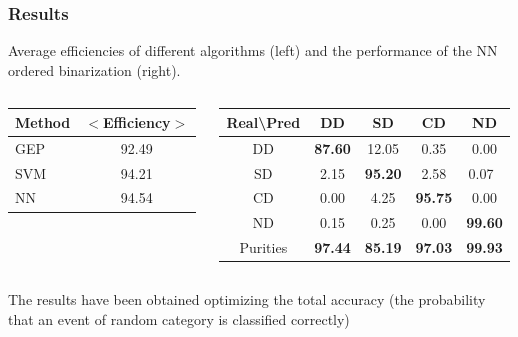 \documentclass[hyperref={pdfpagelabels=false}]{beamer}
\begin{document}
{
  \frametitle{Results}

Average efficiencies of different algorithms (left) and the performance of the NN ordered binarization (right). 

\begin{columns}
\begin{column}{4cm}

{\scriptsize
\begin{table}
\hspace{1.0cm}
\begin{tabular}{l|c}
Method & $<$Efficiency$>$ \\ \hline
GEP & 92.49 \\
SVM & 94.21 \\
NN & 94.54 \\
\end{tabular}
\end{table}
}
\end{column}
\begin{column}{7cm}

\hspace{2.2cm}
{\scriptsize
\begin{table}
\begin{tabular}{c|cccc}
  Real\textbackslash Pred & DD & SD & CD & ND \\ \hline
  DD & {\bf 87.60} & 12.05 & 0.35 & 0.00 \\
  SD & 2.15 & {\bf 95.20} & 2.58 & 0.07 \\
  CD & 0.00 & 4.25 & {\bf 95.75} & 0.00 \\
  ND & 0.15 & 0.25 & 0.00 & {\bf 99.60} \\ \hline
  Purities &  {\bf 97.44} & {\bf 85.19} & {\bf 97.03} & {\bf 99.93}
\end{tabular}
\end{table}
}
\end{column}

\end{columns}

The results have been obtained optimizing the total accuracy
(the probability that an event of random category is classified correctly)
}
\end{document}
